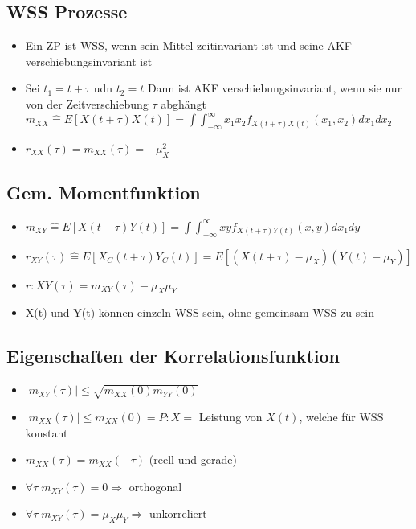 \documentclass{article}
\begin{document}
\subsection{WSS Prozesse}
\begin{itemize}
\item Ein ZP ist WSS, wenn sein Mittel zeitinvariant ist und seine AKF verschiebungsinvariant ist
\item Sei $t_1 = t + \tau$ udn $ t_2 = t$ Dann ist AKF verschiebungsinvariant, wenn sie nur von der Zeitverschiebung $\tau$ abghängt \\
$m_{XX} \hat{=} E[X(t+\tau)X(t)] = \int\int_{-\infty}^\infty x_1x_2f_{X(t+\tau)X(t)}(x_1,x_2)dx_1 dx_2 $
\item $r_{XX}(\tau) = m_{XX}(\tau)=-\mu_X^2$
\end{itemize}


\subsection{Gem. Momentfunktion}
\begin{itemize}
\item$m_{XY} \hat{=} E[X(t+\tau)Y(t)] = \int\int_{-\infty}^\infty xyf_{X(t+\tau)Y(t)}(x,y)dx_1 dy $
\item $r_{XY}(\tau) \hat{=} E[X_C(t+\tau)Y_C(t)] = E[(X(t+\tau)-\mu_X)(Y(t)-\mu_Y)]$
\item $r:{XY}(\tau) = m_{XY}(\tau) -\mu_X\mu_Y$
\item X(t) und Y(t) können einzeln WSS sein, ohne gemeinsam WSS zu sein
\end{itemize}


\subsection{Eigenschaften der Korrelationsfunktion}
\begin{itemize}
\item $|m_{XY}(\tau)| \leq \sqrt{m_{XX}(0)m_{YY}(0)}$
\item$|m_{XX}(\tau)| \leq m_{XX}(0) = P:X =$ Leistung von $X(t)$, welche für WSS konstant
\item $m_{XX}(\tau) = m_{XX}(-\tau)$ (reell und gerade)
\item $ \forall \tau \; m_{XY}(\tau) = 0 \Rightarrow$ orthogonal
\item $ \forall \tau \; m_{XY}(\tau) = \mu_X  \mu_Y \Rightarrow $  unkorreliert
\end{itemize}
\end{document}
